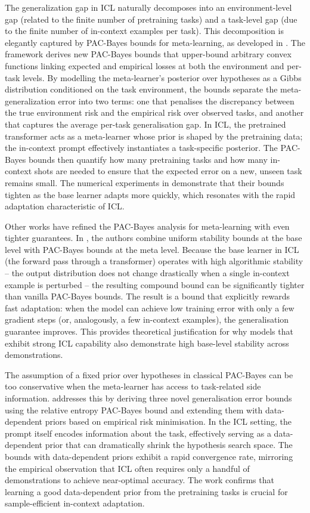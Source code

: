 \documentclass[11pt]{article}
\begin{document}
The generalization gap in ICL naturally decomposes into an environment-level gap (related to the finite number of pretraining tasks) and a task-level gap (due to the finite number of in-context examples per task). This decomposition is elegantly captured by PAC-Bayes bounds for meta-learning, as developed in \cite{ref22}. The framework derives new PAC-Bayes bounds that upper-bound arbitrary convex functions linking expected and empirical losses at both the environment and per-task levels. By modelling the meta-learner's posterior over hypotheses as a Gibbs distribution conditioned on the task environment, the bounds separate the meta-generalization error into two terms: one that penalises the discrepancy between the true environment risk and the empirical risk over observed tasks, and another that captures the average per-task generalisation gap. In ICL, the pretrained transformer acts as a meta-learner whose prior is shaped by the pretraining data; the in-context prompt effectively instantiates a task-specific posterior. The PAC-Bayes bounds then quantify how many pretraining tasks and how many in-context shots are needed to ensure that the expected error on a new, unseen task remains small. The numerical experiments in \cite{ref22} demonstrate that their bounds tighten as the base learner adapts more quickly, which resonates with the rapid adaptation characteristic of ICL.

Other works have refined the PAC-Bayes analysis for meta-learning with even tighter guarantees. In \cite{ref23}, the authors combine uniform stability bounds at the base level with PAC-Bayes bounds at the meta level. Because the base learner in ICL (the forward pass through a transformer) operates with high algorithmic stability -- the output distribution does not change drastically when a single in-context example is perturbed -- the resulting compound bound can be significantly tighter than vanilla PAC-Bayes bounds. The result is a bound that explicitly rewards fast adaptation: when the model can achieve low training error with only a few gradient steps (or, analogously, a few in-context examples), the generalisation guarantee improves. This provides theoretical justification for why models that exhibit strong ICL capability also demonstrate high base-level stability across demonstrations.

The assumption of a fixed prior over hypotheses in classical PAC-Bayes can be too conservative when the meta-learner has access to task-related side information. \cite{ref24} addresses this by deriving three novel generalisation error bounds using the relative entropy PAC-Bayes bound and extending them with data-dependent priors based on empirical risk minimisation. In the ICL setting, the prompt itself encodes information about the task, effectively serving as a data-dependent prior that can dramatically shrink the hypothesis search space. The bounds with data-dependent priors exhibit a rapid convergence rate, mirroring the empirical observation that ICL often requires only a handful of demonstrations to achieve near-optimal accuracy. The work confirms that learning a good data-dependent prior from the pretraining tasks is crucial for sample-efficient in-context adaptation.
\end{document}
